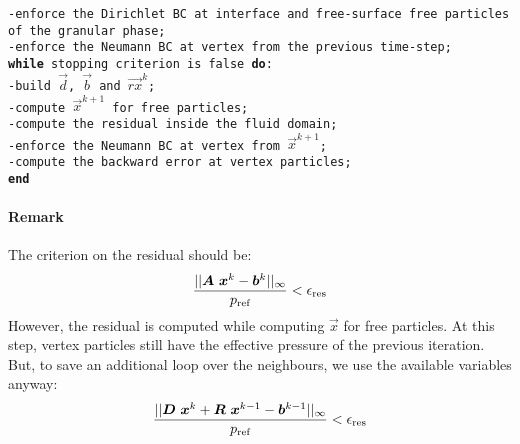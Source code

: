 \documentclass{../GPUSPHtemplate}
\begin{document}
\noindent
\texttt{-enforce the Dirichlet BC at interface and free-surface free particles of the granular phase; \\
-enforce the Neumann BC at vertex from the previous time-step; \\
\textbf{while} stopping criterion is false \textbf{do}: \\
\hspace*{1cm} -build $\vec{d}$, $\vec{b}$ and $\vec{rx}^{k}$; \\
\hspace*{1cm} -compute $\vec{x}^{k+1}$ for free particles; \\
\hspace*{1cm} -compute the residual inside the fluid domain; \\
\hspace*{1cm} -enforce the Neumann BC at vertex from $\vec{x}^{k+1}$; \\
\hspace*{1cm} -compute the backward error at vertex particles; \\
\textbf{end}
}

\paragraph*{Remark}

The criterion on the residual should be:
\[ \dfrac{|| \bm{\bm{A}}\, \, \bm{x}^{k} - \bm{b}^k ||_\infty}{p_{\text{ref}}} < \epsilon_\text{res}\]
%
However, the residual is computed while computing $\vec{x}$ for free particles. At this step, vertex particles still have the effective pressure of the previous iteration. But, to save an additional loop over the neighbours, we use the available variables anyway:
\[ \dfrac{|| \bm{\bm{D}}\, \, \bm{x}^{k} + \bm{\bm{R}}\, \, \bm{x}^{k-1} - \bm{b}^{k-1} ||_\infty}{p_{\text{ref}}} < \epsilon_\text{res}\]

\end{document}
